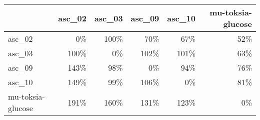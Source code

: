 \begin{tabular}{lrrrrr}
\toprule
 & asc_02 & asc_03 & asc_09 & asc_10 & mu-toksia-glucose \\
\midrule
asc_02 & 0\% & 100\% & 70\% & 67\% & 52\% \\
asc_03 & 100\% & 0\% & 102\% & 101\% & 63\% \\
asc_09 & 143\% & 98\% & 0\% & 94\% & 76\% \\
asc_10 & 149\% & 99\% & 106\% & 0\% & 81\% \\
mu-toksia-glucose & 191\% & 160\% & 131\% & 123\% & 0\% \\
\bottomrule
\end{tabular}
